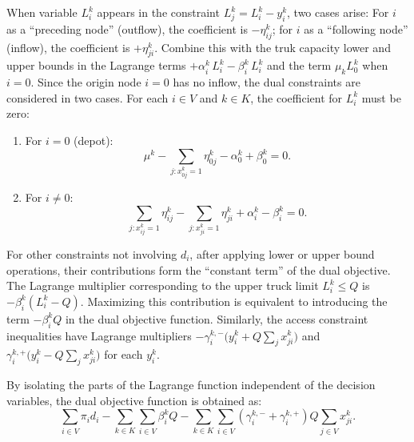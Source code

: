 \documentclass[preprint,12pt,authoryear]{elsarticle}
\begin{document}
When variable $L_i^k$ appears in the constraint $L_j^k = L_i^k - y_i^k$, two cases arise: For $i$ as a “preceding node” (outflow), the coefficient is $-\eta_{ij}^k$; for $i$ as a “following node” (inflow), the coefficient is $+\eta_{ji}^k$. Combine this with the truk capacity lower and upper bounds in the Lagrange terms \(+\alpha_i^k\, L_i^k - \beta_i^k\, L_i^k\) and the term \(\mu_k L_0^k\) when \(i=0\). Since the origin node \(i=0\) has no inflow, the dual constraints are considered in two cases. For each $i\in V$ and $k\in K$, the coefficient for $ L_i^k$ must be zero:
\begin{enumerate}[label= (\arabic*)]
  \item For $i = 0$ (depot):
    \begin{equation*}
        \mu^k - \sum_{j: x_{0j}^k=1} \eta_{0j}^k - \alpha_0^k + \beta_0^k  = 0.
    \end{equation*}
  \item For $i \neq 0$:
    \begin{equation*}
        \sum_{j: x_{ij}^k=1} \eta_{ij}^k - \sum_{j: x_{ji}^k=1} \eta_{ji}^k + \alpha_i^k - \beta_i^k = 0.
    \end{equation*}
\end{enumerate}

For other constraints not involving $d_i$, after applying lower or upper bound operations, their contributions form the “constant term” of the dual objective.  The Lagrange multiplier corresponding to the upper truck limit $L_i^k \le Q$ is $-\beta_i^k (L_i^k - Q)$. Maximizing this contribution is equivalent to introducing the term $-\beta_i^k Q$ in the dual objective function. Similarly, the access constraint inequalities have Lagrange multipliers $-\gamma_i^{k,-} \bigl(y_i^k + Q\sum_{j} x_{ji}^k\bigr)$ and $\gamma_i^{k,+} \bigl( y_i^k - Q\sum_ {j} x_{ji}^k \bigr)$ for each $y_i^k$.

By isolating the parts of the Lagrange function independent of the decision variables, the dual objective function is obtained as:
\begin{equation*}
\sum_{i\in V} \pi_i d_i - \sum_{k\in K}\sum_{i\in V} \beta_i^k Q - \sum_{k\in K}\sum_{i\in V} \left(\gamma_i^{k,-} + \gamma_i^{k,+}\right) Q \sum_{j\in V} x_{ji}^k.
\end{equation*}
\end{document}

